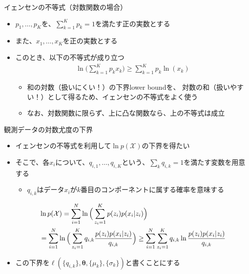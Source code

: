 \documentclass[aspectratio=169,unicode,dvipdfmx,14pt]{beamer}
\begin{document}
\begin{frame}{イェンセンの不等式（対数関数の場合）}
\begin{itemize}
\item $p_1,\ldots,p_K$を、$\sum_{k=1}^K p_k=1$を満たす正の実数とする
\item また、$x_1,\ldots, x_K$を正の実数とする
\item このとき、以下の不等式が成り立つ
\begin{align}
\ln \bigg( \sum_{k=1}^K p_k x_k \bigg) \geq \sum_{k=1}^K p_k \ln(x_k)
\end{align}
\begin{itemize}
\item 和の対数（扱いにくい！）の下界lower boundを、
対数の和（扱いやすい！）として得るため、イェンセンの不等式をよく使う
\item なお、対数関数に限らず、上に凸な関数なら、上の不等式は成立
\end{itemize}
\end{itemize}
\end{frame}

\begin{frame}{観測データの対数尤度の下界}
\begin{itemize}
\item イェンセンの不等式を利用して$\ln p(\mathcal{X})$の下界を得たい
\item そこで、各$x_i$について、$q_{i,1}, \ldots, q_{i,K}$という、$\sum_k q_{i,k}=1$を満たす変数を用意する
\begin{itemize}
\item $q_{i,k}$はデータ$x_i$が$k$番目のコンポーネントに属する確率を意味する
\end{itemize}
\vspace{-.05in}
\begin{align}
& \ln p(\mathcal{X}) = \sum_{i=1}^N \ln \Big( \sum_{z_i=1}^K p(z_i) p(x_i | z_i) \Big)
\notag \\ & = \sum_{i=1}^N \ln \Big( \sum_{z_i=1}^K q_{i,k} \frac{p(z_i) p(x_i | z_i)}{q_{i,k}} \Big)
\geq 
\sum_{i=1}^N \sum_{z_i=1}^K q_{i,k} \ln\frac{p(z_i) p(x_i | z_i)}{q_{i,k}}
\end{align}
\vspace{-.4in}
\item この下界を$\ell(\{q_{i,k}\},\bm{\theta},\{\mu_k\},\{\sigma_k\})$と書くことにする
\end{itemize}
\end{frame}
\end{document}
